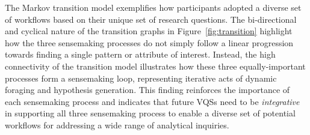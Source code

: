  \par The Markov transition model exemplifies how participants
 adopted a diverse set of workflows
 based on their unique set of research questions. The bi-directional and cyclical nature
 of the transition graphs in Figure~\ref{fig:transition} highlight how the three sensemaking processes do not simply follow a linear progression towards finding a single pattern or attribute of interest. %
 Instead, the high connectivity of the transition model illustrates how these three equally-important processes form a sensemaking loop, representing iterative acts of dynamic foraging and hypothesis generation. This finding reinforces the importance of each sensemaking process and indicates that future VQSs need to be \emph{integrative} in supporting all three sensemaking process to enable a diverse set of potential workflows for addressing a wide range of analytical inquiries. %
